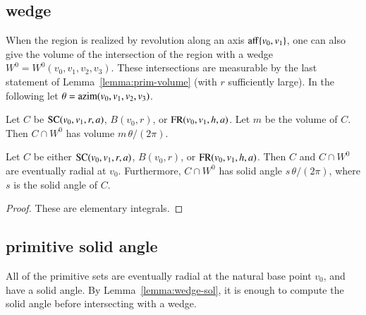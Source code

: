 \subsection{wedge}\label{sec:wedge}
%

When the region is realized by revolution along an axis ${\operatorname{aff}}\{v_0,v_1\}$, 
one can also give the volume of the intersection of the region
with a wedge $W^0=W^0(v_0,v_1,v_2,v_3)$.  These intersections are measurable
by the last statement of Lemma~\ref{lemma:prim-volume} (with $r$ sufficiently
large).
  In the following
let $\theta = {\operatorname{azim}}(v_0,v_1,v_2,v_3)$.
%
%

\begin{lemma}  Let $C$ be ${\operatorname{SC}}(v_0,v_1,r,a)$, $B(v_0,r)$, or
   ${\operatorname{FR}}(v_0,v_1,h,a)$.  Let $m$ be the volume of $C$.  
   Then $C\cap W^0$ has volume $m\,\theta/(2\pi)$.   
\end{lemma}
%

\begin{lemma}  Let $C$ be either ${\operatorname{SC}}(v_0,v_1,r,a)$, $B(v_0,r)$, or
   ${\operatorname{FR}}(v_0,v_1,h,a)$.  Then $C$ and $C\cap W^0$ are eventually 
radial at $v_0$. Furthermore,
    $C\cap W^0$ has solid angle 
  $s\,\theta/(2\pi)$, where $s$ is the solid angle of $C$.
\end{lemma}


\begin{proof}
These are elementary integrals.
\end{proof}


\subsection{primitive solid angle}

All of the primitive sets are eventually radial at the natural
base point $v_0$, and have a
solid angle.  By Lemma~\ref{lemma:wedge-sol}, it is enough to compute
the solid angle before intersecting with a wedge.
%

